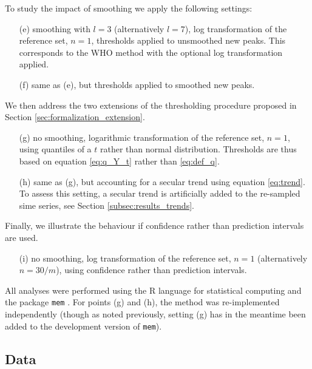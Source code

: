 \documentclass[12pt]{article}
\begin{document}
\noindent To study the impact of smoothing we apply the following settings:
\begin{enumerate}
\item[(e)] smoothing with $l = 3$ (alternatively $l = 7$), log transformation of the reference set, $n = 1$, thresholds applied to unsmoothed new peaks. This corresponds to the WHO method with the optional log transformation applied.
\item[(f)] same as (e), but thresholds applied to smoothed new peaks.
\end{enumerate}
We then address the two extensions of the thresholding procedure proposed in Section \ref{sec:formalization_extension}.
\begin{enumerate}
\item[(g)] no smoothing, logarithmic transformation of the reference set, $n = 1$, using quantiles of a $t$ rather than normal distribution. Thresholds are thus based on equation \eqref{eq:q_Y_t} rather than \eqref{eq:def_q}.
\item[(h)] same as (g), but accounting for a secular trend using equation \eqref{eq:trend}. To assess this setting, a secular trend is artificially added to the re-sampled sime series, see Section \ref{subsec:results_trends}.
\end{enumerate}
Finally, we illustrate the behaviour if confidence rather than prediction intervals are used.
\begin{enumerate}
\item[(i)] no smoothing, log transformation of the reference set, $n = 1$ (alternatively $n = 30/m$), using confidence rather than prediction intervals.
\end{enumerate}
All analyses were performed using the R language for statistical computing \citep{RCT2020} and the package \texttt{mem} \citep{Lozano2020}. For points (g) and (h), the method was re-implemented independently (though as noted previously, setting (g) has in the meantime been added to the development version of \texttt{mem}).

\subsection{Data}
\label{subsec:data}
\end{document}
